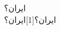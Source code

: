 \documentclass{article}
\begin{document}
\noindent ایران؟   \\
          ایران؟\scalebox{-1}[1]{ایران؟}
\end{document}
